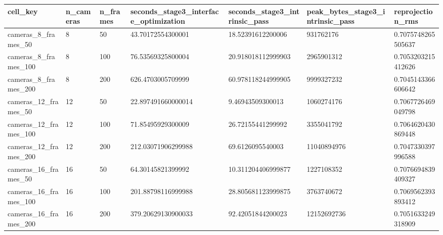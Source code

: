 \begin{tabular}{|l|l|l|l|l|l|l|}
\hline
cell\_key & n\_cameras & n\_frames & seconds\_stage3\_interface\_optimization & seconds\_stage3\_intrinsic\_pass & peak\_bytes\_stage3\_intrinsic\_pass & reprojection\_rms \\
\hline
cameras\_8\_frames\_50 & 8 & 50 & 43.70172554300001 & 18.52391612200006 & 931762176 & 0.7075748265505637 \\
cameras\_8\_frames\_100 & 8 & 100 & 76.53569325800004 & 20.918018112999903 & 2965901312 & 0.7053203215412626 \\
cameras\_8\_frames\_200 & 8 & 200 & 626.4703005709999 & 60.978118244999905 & 9999327232 & 0.7045143366606642 \\
cameras\_12\_frames\_50 & 12 & 50 & 22.897491660000014 & 9.46943509300013 & 1060274176 & 0.7067726469049798 \\
cameras\_12\_frames\_100 & 12 & 100 & 71.85495929300009 & 26.72155441299992 & 3355041792 & 0.7064620430869448 \\
cameras\_12\_frames\_200 & 12 & 200 & 212.03071906299988 & 69.6126095540003 & 11040894976 & 0.7047330397996588 \\
cameras\_16\_frames\_50 & 16 & 50 & 64.30145821399992 & 10.311204406999877 & 1227108352 & 0.7076694839409327 \\
cameras\_16\_frames\_100 & 16 & 100 & 201.88798116999988 & 28.805681123999875 & 3763740672 & 0.7069562393893412 \\
cameras\_16\_frames\_200 & 16 & 200 & 379.20629130900033 & 92.42051844200023 & 12152692736 & 0.7051633249318909 \\
\hline
\end{tabular}

